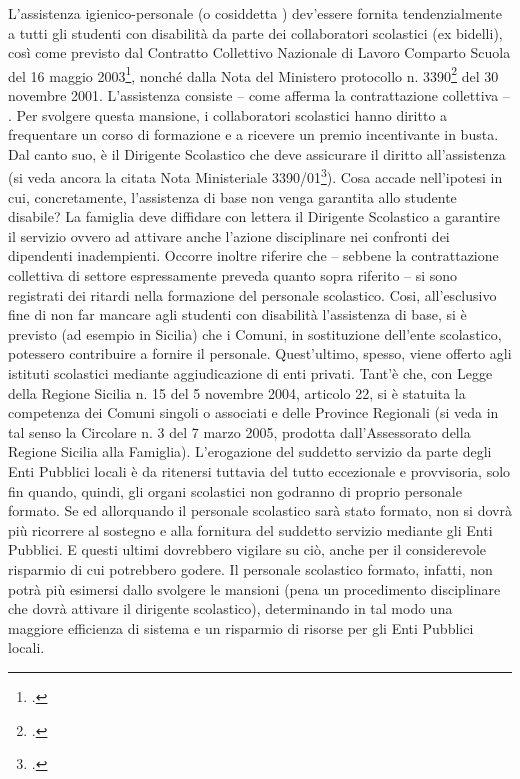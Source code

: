 L'assistenza igienico-personale (o cosiddetta ) dev'essere fornita tendenzialmente a tutti gli studenti con disabilità da parte dei collaboratori scolastici (ex bidelli), così come previsto dal Contratto Collettivo Nazionale di Lavoro Comparto Scuola del 16 maggio 2003\footcite{ccnl_2003}, nonché dalla Nota del Ministero protocollo n. 3390\footcite{Nota3390_2001} del 30 novembre 2001.
L'assistenza consiste – come afferma la contrattazione collettiva – . Per svolgere questa mansione, i collaboratori scolastici hanno diritto a frequentare un corso di formazione e a ricevere un premio incentivante in busta. Dal canto suo, è il Dirigente Scolastico che deve assicurare il diritto all'assistenza (si veda ancora la citata Nota Ministeriale 3390/01\footcite{Nota3390_2001}).
Cosa accade nell'ipotesi in cui, concretamente, l'assistenza di base non venga garantita allo studente disabile? La famiglia deve diffidare con lettera il Dirigente Scolastico a garantire il servizio ovvero ad attivare anche l'azione disciplinare nei confronti dei dipendenti inadempienti. Occorre inoltre riferire che – sebbene la contrattazione collettiva di settore espressamente preveda quanto sopra riferito – si sono registrati dei ritardi nella formazione del personale scolastico. Cosi, all'esclusivo fine di non far mancare agli studenti con disabilità l'assistenza di base, si è previsto (ad esempio in Sicilia) che i Comuni, in sostituzione dell'ente scolastico, potessero contribuire a fornire il personale. Quest'ultimo, spesso, viene offerto agli istituti scolastici mediante aggiudicazione di enti privati. Tant'è che, con Legge della Regione Sicilia n. 15 del 5 novembre 2004, articolo 22, si è statuita la competenza dei Comuni singoli o associati e delle Province Regionali  (si veda in tal senso la Circolare n. 3 del 7 marzo 2005, prodotta dall'Assessorato della Regione Sicilia alla Famiglia).
L'erogazione del suddetto servizio da parte degli Enti Pubblici locali è da ritenersi tuttavia del tutto eccezionale e provvisoria, solo fin quando, quindi, gli organi scolastici non godranno di proprio personale formato. Se ed allorquando il personale scolastico sarà stato formato, non si dovrà più ricorrere al sostegno e alla fornitura del suddetto servizio mediante gli Enti Pubblici. E questi ultimi dovrebbero vigilare su ciò, anche per il considerevole risparmio di cui potrebbero godere. Il personale scolastico formato, infatti, non potrà più esimersi dallo svolgere le mansioni (pena un procedimento disciplinare che dovrà attivare il dirigente scolastico), determinando in tal modo una maggiore efficienza di sistema e un risparmio di risorse per gli Enti Pubblici locali.

